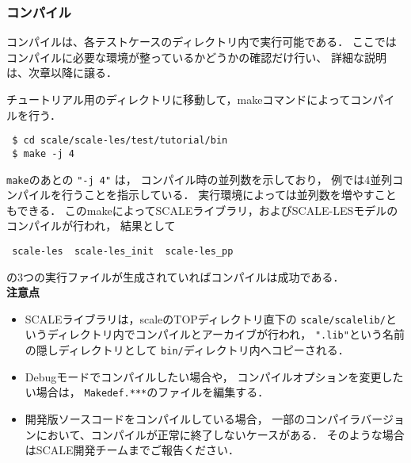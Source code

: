 \subsubsection{コンパイル}
コンパイルは、各テストケースのディレクトリ内で実行可能である．
ここではコンパイルに必要な環境が整っているかどうかの確認だけ行い、
詳細な説明は、次章以降に譲る．

チュートリアル用のディレクトリに移動して，makeコマンドによってコンパイルを行う．
\begin{verbatim}
 $ cd scale/scale-les/test/tutorial/bin
 $ make -j 4
\end{verbatim}
\verb|make|のあとの \verb|"-j 4"| は，
コンパイル時の並列数を示しており，
例では4並列コンパイルを行うことを指示している．
実行環境によっては並列数を増やすこともできる．
このmakeによってSCALEライブラリ，およびSCALE-LESモデルのコンパイルが行われ，
結果として
\begin{verbatim}
 scale-les  scale-les_init  scale-les_pp
\end{verbatim}
の3つの実行ファイルが生成されていればコンパイルは成功である．\\


{\bf 注意点}
\begin{itemize}
\item SCALEライブラリは，scaleのTOPディレクトリ直下の
 \verb|scale/scalelib/|というディレクトリ内でコンパイルとアーカイブが行われ，
 \verb|".lib"|という名前の隠しディレクトリとして
 \verb|bin/|ディレクトリ内へコピーされる．
\item Debugモードでコンパイルしたい場合や，
 コンパイルオプションを変更したい場合は，
 \verb|Makedef.***|のファイルを編集する．
\item 開発版ソースコードをコンパイルしている場合，
 一部のコンパイラバージョンにおいて、コンパイルが正常に終了しないケースがある．
 そのような場合はSCALE開発チームまでご報告ください．
\end{itemize}



